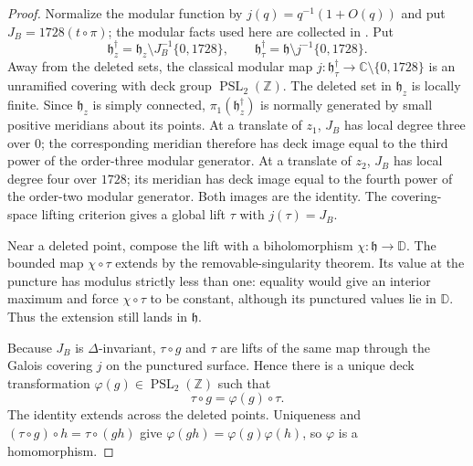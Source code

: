 \begin{proof}
Normalize the modular function by
\(j(q)=q^{-1}(1+O(q))\) and put
\(J_B=1728(t\circ\pi)\); the modular facts used here are collected in
\cite[Chapter~VII]{Serre1973}.  Put
\[
 \mathfrak h_z^\dagger=
 \mathfrak h_z\setminus J_B^{-1}\{0,1728\},\qquad
 \mathfrak h_\tau^\dagger=
 \mathfrak h\setminus j^{-1}\{0,1728\}.
\]
Away from the deleted sets, the classical modular map
\(j:\mathfrak h_\tau^\dagger\to\mathbb C\setminus\{0,1728\}\) is an
unramified covering with deck group
\(\operatorname{PSL}_2(\mathbb Z)\).  The deleted set in
\(\mathfrak h_z\) is locally finite.  Since \(\mathfrak h_z\) is simply
connected, \(\pi_1(\mathfrak h_z^\dagger)\) is normally generated by small
positive meridians about its points.  At a translate of \(z_1\), \(J_B\)
has local degree three over \(0\); the corresponding meridian therefore has
deck image equal to the third power of the order-three modular generator.
At a translate of \(z_2\), \(J_B\) has local degree four over \(1728\); its
meridian has deck image equal to the fourth power of the order-two modular
generator.  Both images are the identity.  The covering-space lifting
criterion gives a global lift \(\tau\) with \(j(\tau)=J_B\).

Near a deleted point, compose the lift with a biholomorphism
\(\chi:\mathfrak h\to\mathbb D\).  The bounded map \(\chi\circ\tau\)
extends by the removable-singularity theorem.  Its value at the puncture has
modulus strictly less than one: equality would give an interior maximum and
force \(\chi\circ\tau\) to be constant, although its punctured values lie in
 \(\mathbb D\).  Thus the extension still lands in \(\mathfrak h\).

Because \(J_B\) is \(\Delta\)-invariant, \(\tau\circ g\) and \(\tau\) are
lifts of the same map through the Galois covering \(j\) on the punctured
surface.  Hence there is a unique deck transformation
\(\varphi(g)\in\operatorname{PSL}_2(\mathbb Z)\) such that
\begin{equation}
 \tau\circ g=\varphi(g)\circ\tau.
\label{wb:eq:period-deck-homomorphism}
\end{equation}
The identity extends across the deleted points.  Uniqueness and
\((\tau\circ g)\circ h=\tau\circ(gh)\) give
\(\varphi(gh)=\varphi(g)\varphi(h)\), so \(\varphi\) is a homomorphism.


\end{proof}
